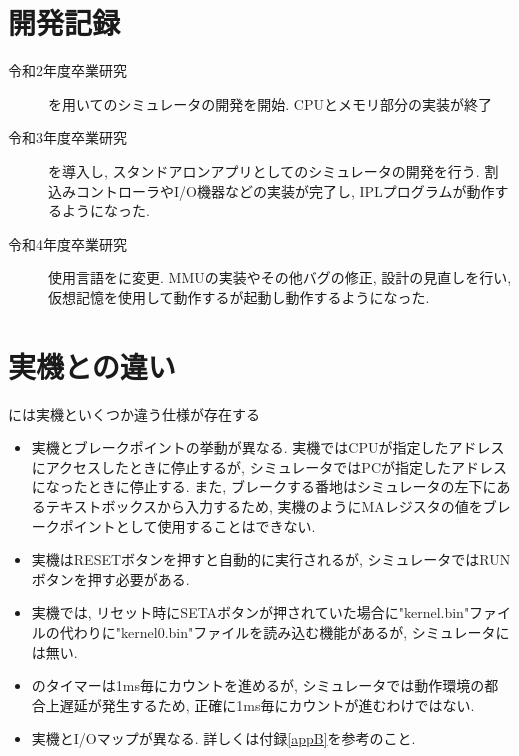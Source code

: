 \section{開発記録}

\begin{description}
    \item[令和2年度卒業研究] \js を用いて\tac のシミュレータの開発を開始. CPUとメモリ部分の実装が終了
    \item[令和3年度卒業研究] \electron を導入し, スタンドアロンアプリとして\tac のシミュレータの開発を行う. 割込みコントローラやI/O機器などの実装が完了し, IPLプログラムが動作するようになった.
    \item[令和4年度卒業研究] 使用言語を\ts に変更. MMUの実装やその他バグの修正, 設計の見直しを行い, 仮想記憶を使用して動作する\tacos が起動し動作するようになった.
\end{description}

\section{実機との違い}

\tacsim には\tac 実機といくつか違う仕様が存在する

\begin{itemize}
    \item \tac 実機とブレークポイントの挙動が異なる. 実機ではCPUが指定したアドレスにアクセスしたときに停止するが, シミュレータではPCが指定したアドレスになったときに停止する. また, ブレークする番地はシミュレータの左下にあるテキストボックスから入力するため, 実機のようにMAレジスタの値をブレークポイントとして使用することはできない.
    \item 実機はRESETボタンを押すと自動的に実行されるが, シミュレータではRUNボタンを押す必要がある.
    \item 実機では, リセット時にSETAボタンが押されていた場合に"\bs kernel.bin"ファイルの代わりに"\bs kernel0.bin"ファイルを読み込む機能があるが, シミュレータには無い.
    \item \tac のタイマーは1ms毎にカウントを進めるが, シミュレータでは動作環境の都合上遅延が発生するため, 正確に1ms毎にカウントが進むわけではない.
    \item 実機とI/Oマップが異なる. 詳しくは付録\ref{appB}を参考のこと.
\end{itemize}